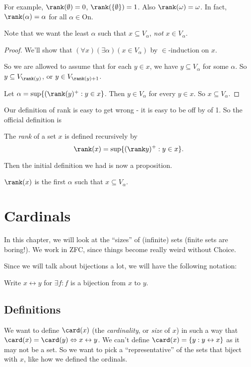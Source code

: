 \documentclass[a4paper]{article}
\begin{document}
For example, $\rank(\emptyset) = 0$, $\rank(\{\emptyset\}) = 1$. Also $\rank(\omega) = \omega$. In fact, $\rank(\alpha) = \alpha$ for all $\alpha\in \mathrm{On}$.

Note that we want the least $\alpha$ such that $x\subseteq V_\alpha$, \emph{not} $x\in V_\alpha$.

\begin{proof}
  We'll show that $(\forall x)(\exists \alpha)(x\in V_\alpha)$ by $\in$-induction on $x$.

  So we are allowed to assume that for each $y\in x$, we have $y\subseteq V_\alpha$ for some $\alpha$. So $y\subseteq V_{\rank(y)}$, or $y\in V_{\rank(y) + 1}$.

  Let $\alpha = \sup\{(\rank(y)^+: y\in x\}$. Then $y\in V_\alpha$ for every $y\in x$. So $x\subseteq V_\alpha$.
\end{proof}

Our definition of rank is easy to get wrong - it is easy to be off by of 1. So the official definition is
\begin{defi}[Rank]
  The \emph{rank} of a set $x$ is defined recursively by
  \[
    \rank(x) = \sup\{(\rank y)^+ : y\in x\}.
  \]
\end{defi}

Then the initial definition we had is now a proposition.
\begin{prop}
  $\rank(x)$ is the first $\alpha$ such that $x\subseteq V_\alpha$.
\end{prop}

\section{Cardinals}
In this chapter, we will look at the ``sizes'' of (infinite) sets (finite sets are boring!). We work in ZFC, since things become really weird without Choice.

Since we will talk about bijections a lot, we will have the following notation:
\begin{notation}
  Write $x\leftrightarrow y$ for $\exists f: f$ is a bijection from $x$ to $y$.
\end{notation}

\subsection{Definitions}
We want to define $\card(x)$ (the \emph{cardinality}, or \emph{size} of $x$) in such a way that $\card(x) = \card(y) \Leftrightarrow x\leftrightarrow y$. We can't define $\card(x) = \{y: y\leftrightarrow x\}$ as it may not be a set. So we want to pick a ``representative'' of the sets that biject with $x$, like how we defined the ordinals.
\end{document}
